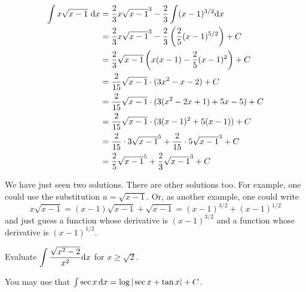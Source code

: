 \begin{solution}
\begin{description}
\begin{align*}
\int x\sqrt{x-1}~\mathrm{d}x&=\frac{2}{3}x\sqrt{x-1}^3 - \frac{2}{3}\int(x-1)^{3/2}\mathrm{d}x \\
&= \frac{2}{3}x\sqrt{x-1}^3 - \frac{2}{3}\left(\frac{2}{5}(x-1)^{5/2}\right)+C\\
&=\frac{2}{3}\sqrt{x-1}\left(x(x-1)-\frac{2}{5}(x-1)^2\right)+C\\
&=\frac{2}{15}\sqrt{x-1}\cdot(3x^2-x-2)+C\\
&=\frac{2}{15}\sqrt{x-1}\cdot(3(x^2-2x+1)+5x-5)+C\\
&=\frac{2}{15}\sqrt{x-1}\cdot(3(x-1)^2+5(x-1))+C\\
&=\frac{2}{15}\cdot 3\sqrt{x-1}^5 +\frac{2}{15}\cdot 5\sqrt{x-1}^3+C\\
&=\frac{2}{5}\sqrt{x-1}^5 +\frac{2}{3}\sqrt{x-1}^3+C
\end{align*}
\end{description}
We have just seen two solutions. There are other solutions too. For example, one could use the substitution $u=\sqrt{x-1}$. Or, as another example, one could write
\begin{equation*}
x\sqrt{x-1} = (x-1)\sqrt{x-1} +\sqrt{x-1} = (x-1)^{3/2} + (x-1)^{1/2}
\end{equation*}
and just guess a function whose derivative is $(x-1)^{3/2}$ and a function whose derivative is 
$(x-1)^{1/2}$. 

\end{solution}







\begin{question} Evaluate
$\displaystyle\int \frac{\sqrt{x^2-2}}{x^2}\mathrm{d}x$ for $x\ge\sqrt{2}$.

You may use that  $\int \sec x\,\mathrm{d}x = \log|\sec x+\tan x| +C$.
\end{question}

